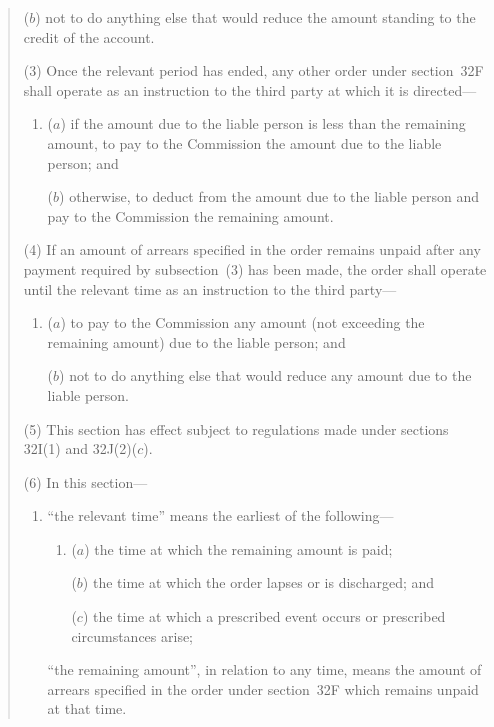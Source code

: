 \documentclass[12pt,a4paper]{article}
\begin{document}
\begin{quotation}
\begin{enumerate}
($b$) not to do anything else that would reduce the amount standing to the credit
of the account.
\end{enumerate}

(3) Once the relevant period has ended, any other order under section~32F shall
operate as an instruction to the third party at which it is directed---
\begin{enumerate}\item[]
($a$) if the amount due to the liable person is less than the remaining amount, to
pay to the Commission the amount due to the liable person; and

($b$) otherwise, to deduct from the amount due to the liable person and pay to the
Commission the remaining amount.
\end{enumerate}

(4) If an amount of arrears specified in the order remains unpaid after any payment
required by subsection~(3) has been made, the order shall operate until the relevant
time as an instruction to the third party---
\begin{enumerate}\item[]
($a$) to pay to the Commission any amount (not exceeding the remaining
amount) due to the liable person; and

($b$) not to do anything else that would reduce any amount due to the liable
person.
\end{enumerate}

(5) This section has effect subject to regulations made under sections 32I(1) and
32J(2)($c$).

(6) In this section---
\begin{enumerate}\item[]
“the relevant time” means the earliest of the following---
\begin{enumerate}\item[]
($a$) the time at which the remaining amount is paid;

($b$) the time at which the order lapses or is discharged; and

($c$) the time at which a prescribed event occurs or prescribed circumstances
arise;
\end{enumerate}

“the remaining amount”, in relation to any time, means the amount of arrears
specified in the order under section~32F which remains unpaid at that time.
\end{enumerate}

\begin{sloppypar}

\end{sloppypar}
\end{quotation}
\end{document}
